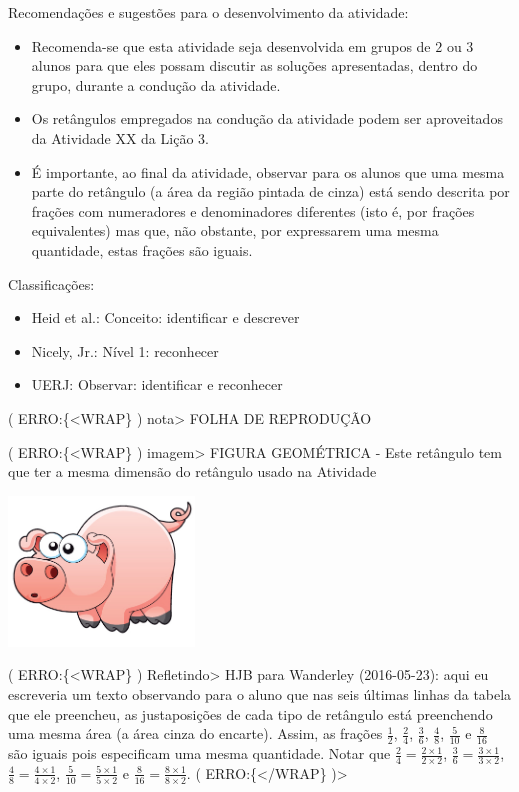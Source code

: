 \documentclass[a4,12pt]{book}
\newcounter{atividade}
\begin{document}
Recomendações e sugestões para o desenvolvimento da atividade:
\begin{itemize} %
  \item     Recomenda-se que esta atividade seja desenvolvida em grupos de     $2$     ou     $3$     alunos para que eles possam discutir as soluções apresentadas, dentro do grupo, durante a condução da atividade.
  \item     Os retângulos empregados na condução da atividade podem ser aproveitados da Atividade XX da Lição 3.
  \item     É importante, ao final da atividade, observar para os alunos que uma mesma parte do retângulo (a área da região pintada de cinza) está sendo descrita por frações com numeradores e denominadores diferentes (isto é, por frações equivalentes) mas que, não obstante, por expressarem uma mesma quantidade, estas frações são iguais. 
\end{itemize} %


Classificações:
\begin{itemize} %
  \item     Heid et al.: Conceito: identificar e descrever
  \item     Nicely, Jr.: Nível 1: reconhecer
  \item     UERJ: Observar: identificar e reconhecer
\end{itemize} %

( ERRO:\{<WRAP\} ) nota>
FOLHA DE REPRODUÇÃO

( ERRO:\{<WRAP\} ) imagem> FIGURA GEOMÉTRICA - Este retângulo tem que ter a mesma dimensão do retângulo usado na Atividade 

\includegraphics[width=\textwidth,height=4cm, keepaspectratio]{pig}


( ERRO:\{<WRAP\} ) Refletindo>
HJB para Wanderley (2016-05-23): aqui eu escreveria um texto observando para o aluno que nas seis últimas linhas da tabela que ele preencheu, as justaposições de cada tipo de retângulo está preenchendo uma mesma área (a área cinza do encarte). Assim, as frações $\frac{1}{2}$, $\frac{2}{4}$, $\frac{3}{6}$, $\frac{4}{8}$, $\frac{5}{10}$ e $\frac{8}{16}$ são iguais pois especificam uma mesma quantidade.
Notar que
$\frac{2}{4} = \frac{2 \times 1}{2 \times 2}$, 
$\frac{3}{6} = \frac{3 \times 1}{3 \times 2}$, 
$\frac{4}{8} = \frac{4 \times 1}{4 \times 2}$, 
$\frac{5}{10} = \frac{5 \times 1}{5 \times 2}$ e
$\frac{8}{16} = \frac{8 \times 1}{8 \times 2}$.
( ERRO:\{</WRAP\} )>
\end{document}
